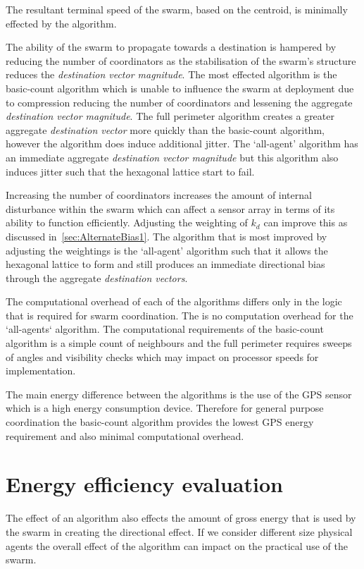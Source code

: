 The resultant terminal speed of the swarm, based on the centroid, is minimally effected by the algorithm. 

The ability of the swarm to propagate towards a destination is hampered by reducing the number of coordinators as the stabilisation of the swarm's structure reduces the \textit{destination vector magnitude}. The most effected algorithm is the basic-count algorithm which is unable to influence the swarm at deployment due to compression reducing the number of coordinators and lessening the aggregate \textit{destination vector magnitude}. The full perimeter algorithm creates a greater aggregate \textit{destination vector} more quickly than the basic-count algorithm, however the algorithm does induce additional jitter. The `all-agent' algorithm has an immediate aggregate \textit{destination vector magnitude} but this algorithm also induces jitter such that the hexagonal lattice start to fail.
 
Increasing the number of coordinators increases the amount of internal disturbance within the swarm which can affect a sensor array in terms of its ability to function efficiently. Adjusting the weighting of $k_d$ can improve this as discussed in~\autoref{sec:AlternateBias1}. The algorithm that is most improved by adjusting the weightings is the `all-agent' algorithm such that it allows the hexagonal lattice to form and still produces an immediate directional bias through the aggregate \textit{destination vectors}.  

The computational overhead of each of the algorithms differs only in the logic that is required for swarm coordination. The is no computation overhead for the `all-agents` algorithm. The computational requirements of the basic-count algorithm is a simple count of neighbours and the full perimeter requires sweeps of angles and visibility checks which may impact on processor speeds for implementation. 

The main energy difference between the algorithms is the use of the GPS sensor which is a high energy consumption device. Therefore for general purpose coordination the basic-count algorithm provides the lowest GPS energy requirement and also minimal computational overhead.

\section{Energy efficiency evaluation\label{reduced:EnergyReductionGPS}}
The effect of an algorithm also effects the amount of gross energy that is used by the swarm in creating the directional effect. If we consider different size physical agents the overall effect of the algorithm can impact on the practical use of the swarm.

